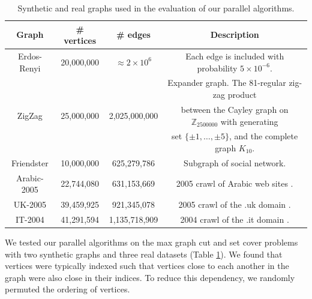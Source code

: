 \documentclass{article} %
\begin{document}
\begin{table}[h]
\centering\footnotesize
\begin{tabular}{|c|c|c|c|}\hline
Graph & \# vertices & \# edges & Description \\\hline\hline
Erdos-Renyi & 20,000,000 & $\approx 2 \times 10^6$ & Each edge is included with probability $5\times 10^{-6}$.\\\hline
\multirow{3}{*}{ZigZag}      & \multirow{3}{*}{25,000,000} &  \multirow{3}{*}{2,025,000,000} & Expander graph. The 81-regular zig-zag product \\
& & & between the Cayley graph on $\mathbb{Z}_{2500000}$ with generating \\
& & & set $\{\pm 1,\dots,\pm 5\}$, and the complete graph $K_{10}$.\\\hline
Friendster  & 10,000,000 &    625,279,786 & Subgraph of social network. \cite{snap}\\\hline
Arabic-2005 & 22,744,080 &    631,153,669 & 2005 crawl of Arabic web sites \cite{BoVWFI, BRSLLP, BCSU3}. \\\hline
UK-2005     & 39,459,925 &    921,345,078 & 2005 crawl of the .uk domain \cite{BoVWFI, BRSLLP, BCSU3}. \\\hline
IT-2004     & 41,291,594 &  1,135,718,909 & 2004 crawl of the .it domain \cite{BoVWFI, BRSLLP, BCSU3}. \\\hline
\end{tabular}
\caption{\footnotesize Synthetic and real graphs used in the evaluation of our parallel algorithms.}
\label{tab:graphstats}
\end{table}



We tested our parallel algorithms on the max graph cut and set cover problems with two synthetic graphs and three real datasets (Table \ref{tab:graphstats}).
We found that vertices were typically indexed such that vertices close to each another in the graph were also close in their indices.
To reduce this dependency, we randomly permuted the ordering of vertices.
\end{document}
